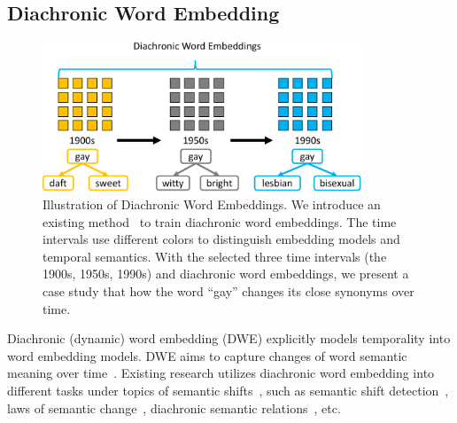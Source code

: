 \subsection{Diachronic Word Embedding}
\label{chap2:sec:dwe}

\begin{figure}[tb!]
\centering
\includegraphics[width=0.85\textwidth]{images/chapter2/diachronic.pdf}
\caption{Illustration of Diachronic Word Embeddings. We introduce an existing method~\cite{kulkarni2015statistically} to train diachronic word embeddings. The time intervals use different colors to distinguish embedding models and temporal semantics. With the selected three time intervals (the 1900s, 1950s, 1990s) and diachronic word embeddings, we present a case study that how the word ``gay'' changes its close synonyms over time.}
\label{chap2:fig:diachronic}
\end{figure}

Diachronic (dynamic) word embedding (DWE) explicitly models temporality into word embedding models.
DWE aims to capture changes of word semantic meaning over time~\cite{kutuzov2018diachronic}.
Existing research utilizes diachronic word embedding into different tasks under topics of semantic shifts~\cite{kutuzov2018diachronic}, such as semantic shift detection~\cite{mihalcea2012word, kim2014temporal, kulkarni2015statistically, rudolph2018dynamic, yao2018dynamic, rosenfeld2018deep}, laws of semantic change~\cite{hamilton2016diachronic, dubossarsky2017outta}, diachronic semantic relations~\cite{rosin2017learning, szymanski2017temporal}, etc.

